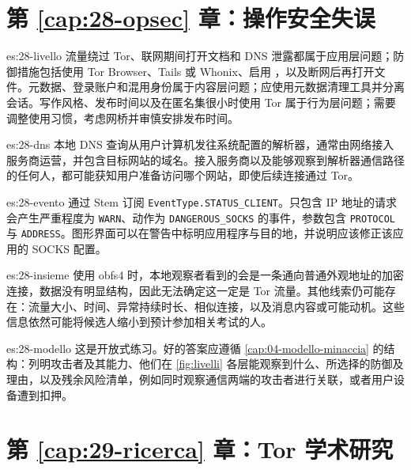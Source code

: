 \section*{第 \ref{cap:28-opsec} 章：操作安全失误}

\begin{soluzione}{es:28-livello}
流量绕过 Tor、联网期间打开文档和 DNS 泄露都属于应用层问题；防御措施包括使用 Tor Browser、Tails 或 Whonix、启用 ，以及断网后再打开文件。元数据、登录账户和混用身份属于内容层问题；应使用元数据清理工具并分离会话。写作风格、发布时间以及在匿名集很小时使用 Tor 属于行为层问题；需要调整使用习惯，考虑网桥并审慎安排发布时间。
\end{soluzione}

\begin{soluzione}{es:28-dns}
本地 DNS 查询从用户计算机发往系统配置的解析器，通常由网络接入服务商运营，并包含目标网站的域名。接入服务商以及能够观察到解析器通信路径的任何人，都可能获知用户准备访问哪个网站，即使后续连接通过 Tor。
\end{soluzione}

\begin{soluzione}{es:28-evento}
通过 Stem 订阅 \texttt{EventType.STATUS\_CLIENT}。只包含 IP 地址的请求会产生严重程度为 \texttt{WARN}、动作为 \texttt{DANGEROUS\_SOCKS} 的事件，参数包含 \texttt{PROTOCOL} 与 \texttt{ADDRESS}。图形界面可以在警告中标明应用程序与目的地，并说明应该修正该应用的 SOCKS 配置。
\end{soluzione}

\begin{soluzione}{es:28-insieme}
使用 obfs4 时，本地观察者看到的会是一条通向普通外观地址的加密连接，数据没有明显结构，因此无法确定这一定是 Tor 流量。其他线索仍可能存在：流量大小、时间、异常持续时长、相似连接，以及消息内容或可能动机。这些信息依然可能将候选人缩小到预计参加相关考试的人。
\end{soluzione}

\begin{soluzione}{es:28-modello}
这是开放式练习。好的答案应遵循 \cref{cap:04-modello-minaccia} 的结构：列明攻击者及其能力、他们在 \cref{fig:livelli} 各层能观察到什么、所选择的防御及理由，以及残余风险清单，例如同时观察通信两端的攻击者进行关联，或者用户设备遭到扣押。
\end{soluzione}

\section*{第 \ref{cap:29-ricerca} 章：Tor 学术研究}

